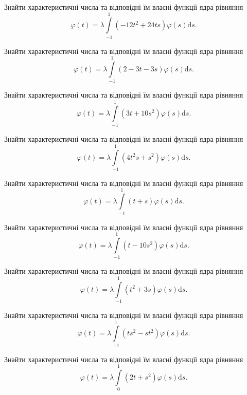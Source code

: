 \documentclass[12pt]{extarticle}
\begin{document}
\begin{Exercise}
Знайти характеристичні числа та відповідні їм власні функції ядра рівняння \[\varphi(t) = \lambda\int\limits_{-1}^{1} (-12 t^2 + 24 ts) \varphi(s) \mathrm{d}s.\]
\end{Exercise}

\begin{Exercise}
Знайти характеристичні числа та відповідні їм власні функції ядра рівняння \[\varphi(t) = \lambda\int\limits_{-1}^{1} (2-3t -3s) \varphi(s) \mathrm{d}s.\]
\end{Exercise}

\begin{Exercise}
Знайти характеристичні числа та відповідні їм власні функції ядра рівняння \[\varphi(t) = \lambda\int\limits_{-1}^{1} (3t+10s^2) \varphi(s) \mathrm{d}s.\]
\end{Exercise}

\begin{Exercise}
Знайти характеристичні числа та відповідні їм власні функції ядра рівняння \[\varphi(t) = \lambda\int\limits_{-1}^{1} (4t^2 s+s^2) \varphi(s) \mathrm{d}s.\]
\end{Exercise}

\begin{Exercise}
Знайти характеристичні числа та відповідні їм власні функції ядра рівняння \[\varphi(t) = \lambda\int\limits_{-1}^{1} (t+s) \varphi(s) \mathrm{d}s.\]
\end{Exercise}

\begin{Exercise}
Знайти характеристичні числа та відповідні їм власні функції ядра рівняння \[\varphi(t) = \lambda\int\limits_{-1}^{1} (t-10s^2) \varphi(s) \mathrm{d}s.\]
\end{Exercise}

\begin{Exercise}
Знайти характеристичні числа та відповідні їм власні функції ядра рівняння \[\varphi(t) = \lambda\int\limits_{-1}^{1} (t^2+3s) \varphi(s) \mathrm{d}s.\]
\end{Exercise}

\begin{Exercise}
Знайти характеристичні числа та відповідні їм власні функції ядра рівняння \[\varphi(t) = \lambda\int\limits_{-1}^{1} (ts^2-st^2) \varphi(s) \mathrm{d}s.\]
\end{Exercise}

\begin{Exercise}
Знайти характеристичні числа та відповідні їм власні функції ядра рівняння \[\varphi(t) = \lambda\int\limits_{0}^{1} (2t+s^2) \varphi(s) \mathrm{d}s.\]
\end{Exercise}
\end{document}
